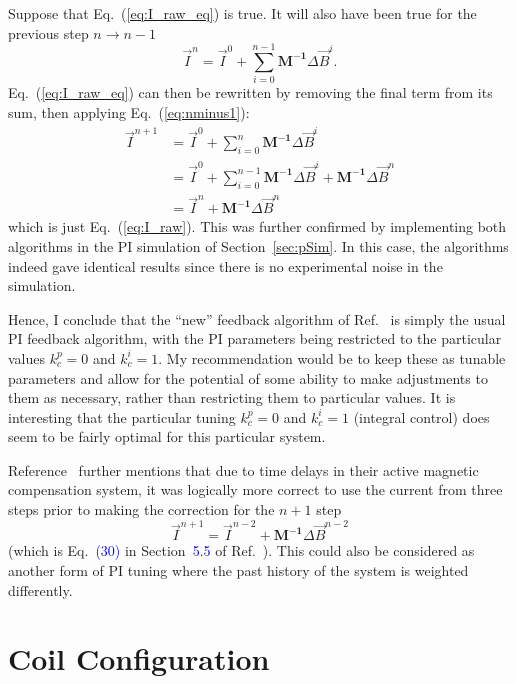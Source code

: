 Suppose that Eq.~(\ref{eq:I_raw_eq}) is true.  It will also have been
true for the previous step $n\rightarrow n-1$
\begin{equation}\label{eq:nminus1}
    \vec{I}^{n}= \vec{I}^{0}+\sum_{i=0}^{n-1} \bm{M^{-1}}\Delta \vec{B}^{i}.
\end{equation}
Eq.~(\ref{eq:I_raw_eq}) can then be rewritten by removing the final
term from its sum, then applying Eq.~(\ref{eq:nminus1}):
\begin{equation}
\begin{split}
\vec{I}^{n+1}&=\vec{I}^{0}+\sum_{i=0}^n \bm{M^{-1}}\Delta \vec{B}^{i}\\
&=\vec{I}^{0}+\sum_{i=0}^{n-1}\bm{M^{-1}}\Delta \vec{B}^{i}+ \bm{M^{-1}}\Delta  \vec{B}^{n}\\
&=\vec{I}^{n}+ \bm{M^{-1}}\Delta \vec{B}^{n}
\end{split}
\end{equation}
which is just Eq.~(\ref{eq:I_raw}).  This was further confirmed by
implementing both algorithms in the PI simulation of
Section~\ref{sec:pSim}.  In this case, the algorithms indeed gave
identical results since there is no experimental noise in the
simulation.

Hence, I conclude that the ``new'' feedback algorithm of
Ref.~\cite{rawlik} is simply the usual PI feedback algorithm, with the
PI parameters being restricted to the particular values $k_c^p=0$ and
$k_c^i=1$. My recommendation would be to keep these as tunable
parameters and allow for the potential of some ability to make
adjustments to them as necessary, rather than restricting them
to particular values. It is interesting that the particular tuning
$k_c^p=0$ and $k_c^i=1$ (integral control) does seem to be fairly optimal
for this particular system.

Reference~\cite{rawlik} further mentions that due to time delays in
their active magnetic compensation system, it was logically more
correct to use the current from three steps prior to making the
correction for the $n+1$ step
\begin{equation}\label{eq:I_raw_delay}
    \vec{I}^{n+1}= \vec{I}^{n-2}+\bm{M^{-1}} \Delta \vec{B}^{n-2}
\end{equation}
(which is Eq.~\textcolor{blue}{(30)} in Section~\textcolor{blue}{5.5} of
Ref.~\cite{rawlik}).  This could also be
considered as another form of PI tuning where the past history of the
system is weighted differently.


\section{Coil Configuration}\label{sec:coil_config}



